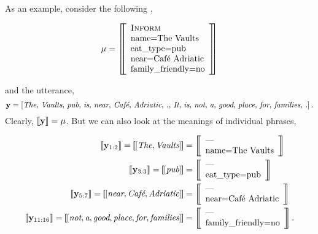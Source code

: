 As an example, consider the following \meaningrepresentation,
\begin{singlespace}
\[
    \mu = \left[\!\!\left[ \begin{array}{l}
        \textsc{Inform} \\
        \textrm{name=The Vaults}\\
        \textrm{eat\_type=pub}\\
        \textrm{near=Caf{\'e} Adriatic}\\
        \textrm{family\_friendly=no}\\
\end{array}\right]\!\!\right] 
\]
\end{singlespace}
and the utterance,
\[
    \mathbf{y} = \left[ \textit{The},\,\textit{Vaults},\,\textit{pub},\,\textit{is},\,\textit{near},\,\textit{Caf{\'e}},\,\textit{Adriatic},\,\textit{.},\,\textit{It},\,\textit{is},\,\textit{not},\,\textit{a},\,\textit{good},\,\textit{place},\,\textit{for},\,\textit{families},\,\textit{.}\right]. 
\]
\noindent Clearly, $\left\llbracket \mathbf{y} \right\rrbracket = \mu$. But we can also look at the
meanings of individual phrases,
\begin{singlespace}
    \begin{align*}
        \denotes{\utttoks_{1:2}} = \left[\!\!\left[ \left[\textit{The}, \textit{Vaults}  \right] \right]\!\!\right] & = \left[\!\!\left[
\begin{array}{l} \textrm{---} \\ \AV{name}{The Vaults}\end{array} \right]\!\!\right] \\
    \denotes{\utttoks_{3:3}} = \left[\!\!\left[ \left[\textit{pub}  \right] \right]\!\!\right] &= \left[\!\!\left[
\begin{array}{l} \textrm{---} \\ \AV{eat\_type}{pub}\end{array} \right]\!\!\right] \\
    \denotes{\utttoks_{5:7}} = \left[\!\!\left[ \left[\textit{near}, \textit{Caf{\'e}}, \textit{Adriatic}  \right] \right]\!\!\right] & = \left[\!\!\left[
\begin{array}{l} \textrm{---} \\ \AV{near}{Caf{\'e} Adriatic}\end{array} \right]\!\!\right] \\
    \denotes{\utttoks_{11:16}} = \left[\!\!\left[ \left[\textit{not}, \textit{a}, \textit{good}, \textit{place}, \textit{for}, \textit{families}  \right] \right]\!\!\right] & = \left[\!\!\left[
\begin{array}{l} \textrm{---} \\ \AV{family\_friendly}{no}\end{array} \right]\!\!\right]. 
\end{align*}
\end{singlespace}
